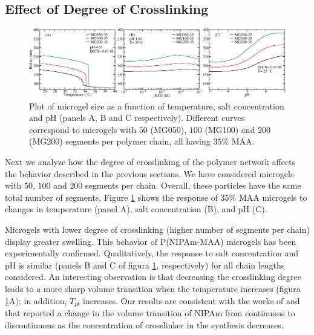 \subsection{Effect of Degree of Crosslinking}


\begin{figure}[!tb]
	\centering
	\includegraphics[width=1\linewidth]{Figures/graph-gel/R-all_xlink.png}
	\caption{Plot of microgel size as a function of temperature, salt concentration and pH (panels A, B and C respectively). 
		Different curves correspond to microgels with $50$ (MG050), $100$ (MG100) and $200$ (MG200) segments per polymer chain, all having $35\%$ MAA.}
	\label{fig:R_xlink}
\end{figure}









Next we analyze how the degree of crosslinking of the polymer network affects the behavior described in the previous sections. 
We have considered microgels with $50$, $100$ and $200$ segments per chain.
Overall, these particles have the same total number of segments.
Figure \ref{fig:R_xlink} shows the response of $35\%$ MAA microgels to changes in temperature (panel A), salt concentration (B), and pH (C).



Microgels with lower degree of crosslinking (higher number of segments per chain) display greater swelling.
This behavior of P(NIPAm-MAA) microgels has been experimentally confirmed.
Qualitatively, the response to salt concentration and pH is similar (panels B and C of figura \ref{fig:R_xlink}, respectively) for all chain lengths considered.
An interesting observation is that decreasing the crosslinking degree leads to a more sharp volume transition when the temperature increases (figura \ref{fig:R_xlink}A);
in addition, $T_{pt}$ increases.
Our results are consistent with the works of  and  that reported a change in the volume transition of NIPAm from continuous to discontinuous as the concentration of crosslinker in the synthesis decreases.



